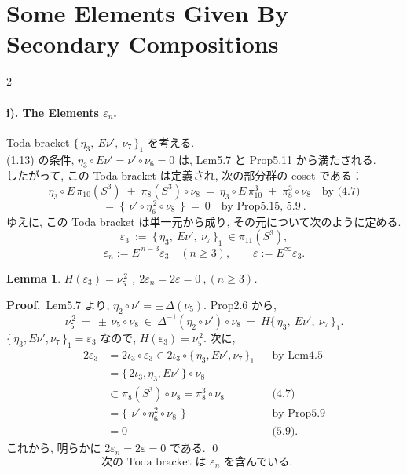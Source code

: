 \documentclass[10pt, leqno]{ltjsarticle}
\author{}
\date{}
\newcommand{\toda}[1]{\{\,#1\,\}}              %
\newcommand{\todai}[2][]{\{\,#2\,\}_{#1}}      %
\newcommand{\gen}[1]{\{\,#1\,\}}       %
\newcommand{\pis}[2]{\pi_{#1}(#2)}       %
\newcommand{\pit}[2]{\pi_{#1}^{#2}}
\numberwithin{equation}{section}
\theoremstyle{plain}
\newtheorem{lemma}[theorem]{Lemma}
\theoremstyle{definition}
\theoremstyle{remark}
\begin{document}
\setcounter{section}{5}
\section{Some Elements Given By Secondary Compositions}

\begin{paracol}{2}

\paragraph{i). The Elements \(\varepsilon_n\).}

Toda bracket \(\todai[1]{\eta_3,\ E\nu',\ \nu_7}\) を考える. \\
(1.13) の条件, \(\eta_3\circ E\nu'= \nu'\circ \nu_6 =0\) 
は, Lem5.7 と Prop5.11 から満たされる. \\
したがって, この Toda bracket は定義され, 次の部分群の coset である：
\[
\eta_3\circ E\,\pi_{10}(S^3)\;+\;\pi_{8}(S^3)\circ \nu_8
\ =\ \eta_3\circ E\,\pi^{3}_{10}\;+\;\pi^{3}_{8}\circ \nu_8 \quad\text{by (4.7)}
\]
\[
=\ \gen{\ \nu'\circ \eta_6^{\,2}\circ \nu_8\ }\ =\ 0
\quad\text{by Prop5.15, 5.9} \ .
\]
ゆえに, この Toda bracket は単一元から成り, その元について次のように定める.
\[
\varepsilon_3\ :=\ \todai[1]{\eta_3,\ E\nu',\ \nu_7}\ \in \pi_{11}(S^3),
\]
\[
\varepsilon_n:=E^{\,n-3}\varepsilon_3\quad (n\ge3),\qquad
\varepsilon:=E^{\infty}\varepsilon_3.
\]

\begin{lemma}\label{lem:6.1}
\(H(\varepsilon_3)=\nu_5^{\,2}\) , 
\(2\varepsilon_n=2\varepsilon=0\ ,(n\ge3)\). 
\end{lemma}

\noindent
\textbf{Proof.}\
Lem5.7 より, \(\eta_2\circ \nu'=\pm\,\Delta(\nu_5) .\)
Prop2.6 から,
\[
\nu_5^{\,2}\ =\ \pm\,\nu_5\circ \nu_8\ \in\ \Delta^{-1}(\eta_2\circ \nu')\circ \nu_8
\ =\ H\todai[1]{\eta_3,\ E\nu',\ \nu_7}.
\]
\(\todai[1]{\eta_3,E\nu',\nu_7} = \varepsilon_3\) なので,
\(H(\varepsilon_3)=\nu_5^{\,2}\).
次に,
\[
\begin{align*}
2\varepsilon_3
&= 2\iota_3\circ \varepsilon_3 \in 2\iota_3\circ \todai[1]{\eta_3,E\nu',\nu_7}
&& \text{by Lem4.5}\\
&= \toda{2\iota_3,\eta_3,E\nu'}\circ \nu_8\\
&\subset \pis{8}{S^3}\circ\nu_8 = \pit{8}{3}\circ\nu_8 
&& \text{(4.7)}\\
&= \gen{\ \nu'\circ \eta_6^{2}\circ \nu_8\ }
&& \text{by Prop5.9}\\
&= 0 
&& \text{(5.9).}
\end{align*}
\]
これから, 明らかに \(2\varepsilon_n=2\varepsilon=0\) である. 
\qed
\begin{equation}\label{eq:6.1}
\text{次の Toda bracket は } \varepsilon_n \text{ を含んでいる. }\quad
\end{equation}


\end{paracol}
\end{document}
